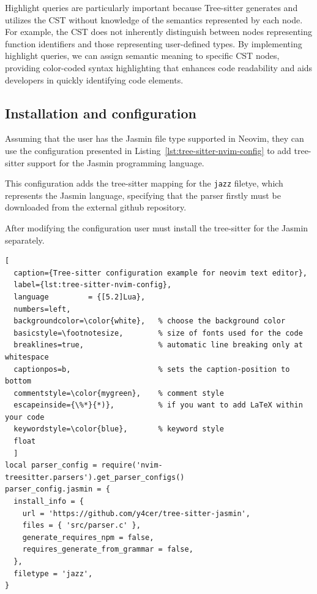 Highlight queries are particularly important because Tree-sitter generates and
utilizes the CST without knowledge of the semantics represented by each node.
For example, the CST does not inherently distinguish between nodes representing
function identifiers and those representing user-defined types. By implementing
highlight queries, we can assign semantic meaning to specific CST nodes,
providing color-coded syntax highlighting that enhances code readability and
aids developers in quickly identifying code elements. 

\subsection{Installation and configuration}

Assuming that the user has the Jasmin file type supported in Neovim, they can
use the configuration presented in Listing~\ref{lst:tree-sitter-nvim-config} to
add tree-sitter support for the Jasmin programming language.

This configuration adds the tree-sitter mapping for the \texttt{jazz} filetye,
which represents the Jasmin language, specifying that the parser firstly must be
downloaded from the external github repository.

After modifying the configuration user must install the tree-sitter for the
Jasmin separately.

\begin{lstlisting}[
  caption={Tree-sitter configuration example for neovim text editor}, 
  label={lst:tree-sitter-nvim-config},
  language         = {[5.2]Lua},
  numbers=left,
  backgroundcolor=\color{white},   % choose the background color
  basicstyle=\footnotesize,        % size of fonts used for the code
  breaklines=true,                 % automatic line breaking only at whitespace
  captionpos=b,                    % sets the caption-position to bottom
  commentstyle=\color{mygreen},    % comment style
  escapeinside={\%*}{*)},          % if you want to add LaTeX within your code
  keywordstyle=\color{blue},       % keyword style
  float
  ]
local parser_config = require('nvim-treesitter.parsers').get_parser_configs()
parser_config.jasmin = {
  install_info = {
    url = 'https://github.com/y4cer/tree-sitter-jasmin',
    files = { 'src/parser.c' },
    generate_requires_npm = false,
    requires_generate_from_grammar = false,
  },
  filetype = 'jazz',
}
\end{lstlisting}

